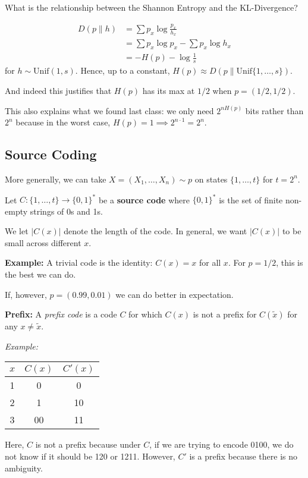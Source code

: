 \documentclass[12pt]{report}
\newcommand{\abs}[1]{\left\vert #1 \right\vert}
\newcommand*{\tbf}[1]{\ifmmode\mathbf{#1}\else\textbf{#1}\fi}
\begin{document}
What is the relationship between the Shannon Entropy and the KL-Divergence?

\begin{align*}
    D(p \parallel h) & = \sum p_x \log \frac{p_x}{h_x}         \\
                     & = \sum p_x \log p_x - \sum p_x \log h_x \\
                     & = -H(p) - \log \frac{1}{s}
\end{align*}
for $h \sim \text{Unif}(1, s)$. Hence, up to a constant, $H(p) \approx D(p \parallel \text{Unif}\{1, \dots, s\})$.

And indeed this justifies that $H(p)$ has its max at $1/2$ when $p = (1/2, 1/2)$.

This also explains what we found last class: we only need $2^{nH(p)}$ bits rather than $2^n$ because in the worst case, $H(p) = 1 \implies 2^{n\cdot 1} = 2^n$.

\subsection{Source Coding}
More generally, we can take $X = (X_1, \dots, X_n) \sim p$ on states $\{1, \dots, t\}$ for $t = 2^n$.

Let $C: \{1, \dots, t\} \to \{0, 1\}^*$ be a \tbf{source code} where $\{0, 1\}^*$ is the set of finite non-empty strings of 0s and 1s.

We let $\abs{C(x)}$ denote the length of the code. In general, we want $\abs{C(x)}$ to be small across different $x$.

\tbf{Example:} A trivial code is the identity: $C(x) = x$ for all $x$. For $p = 1/2$, this is the best we can do.

If, however, $p = (0.99, 0.01)$ we can do better in expectation.

\tbf{Prefix:} A \emph{prefix code} is a code $C$ for which $C(x)$ is not a prefix for $C(\tilde x)$ for any $x \neq \tilde x$.

\emph{Example:}

\qquad \begin{tabular}{c|cc}
    $x$ & $C(x)$ & $C'(x)$ \\ \hline
    1   & 0      & 0       \\
    2   & 1      & 10      \\
    3   & 00     & 11      \\ \hline
\end{tabular}

Here, $C$ is not a prefix because under $C$, if we are trying to encode 0100, we do not know if it should be 120 or 1211. However, $C'$ is a prefix because there is no ambiguity.
\end{document}
